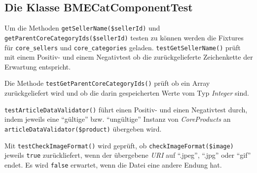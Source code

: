 	\subsection{Die Klasse BMECatComponentTest}
	
	Um die Methoden \texttt{getSellerName(\$sellerId)} und \texttt{getParentCoreCategoryIds(\$sellerId)} testen zu können werden die Fixtures für \texttt{core\_sellers} und \texttt{core\_categories} geladen.
	\texttt{testGetSellerName()} prüft mit einem Positiv- und einem Negativtest ob die zurückgelieferte Zeichenkette der Erwartung entspricht.
	
	Die Methode \texttt{testGetParentCoreCategoryIds()} prüft ob ein Array zurückgeliefert wird und ob die darin gespeicherten Werte vom Typ \textit{Integer} sind.
	
	\texttt{testArticleDataValidator()} führt einen Positiv- und einen Negativtest durch, indem jeweils eine \enquote{gültige} bzw. \enquote{ungültige} Instanz von \textit{CoreProducts} an \texttt{articleDataValidator(\$product)} übergeben wird.
	
	Mit \texttt{testCheckImageFormat()} wird geprüft, ob \texttt{checkImageFormat(\$image)} jeweils \texttt{true} zurückliefert, wenn der übergebene \textit{URI} auf \enquote{.jpeg}, \enquote{.jpg} oder \enquote{gif} endet. Es wird \texttt{false} erwartet, wenn die Datei eine andere Endung hat.
	
	
	
	

	


